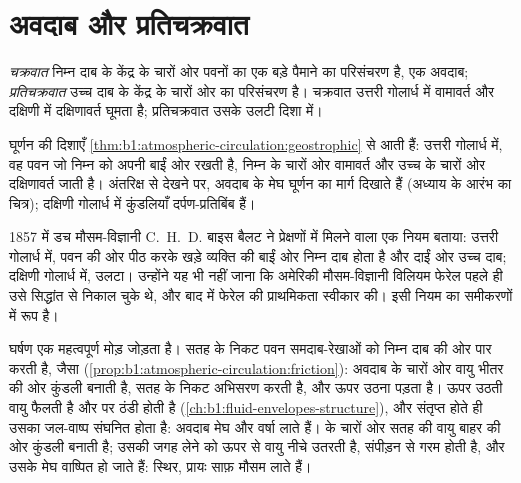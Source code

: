 \section{अवदाब और प्रतिचक्रवात}\label{sec:b1:atmospheric-circulation:cyclones}

\begin{definition}[चक्रवात, प्रतिचक्रवात]\label{def:b1:atmospheric-circulation:cyclone}
\emph{चक्रवात} निम्न दाब के केंद्र के चारों ओर पवनों का एक बड़े पैमाने का परिसंचरण है, एक अवदाब; \emph{प्रतिचक्रवात} उच्च दाब के केंद्र के चारों ओर का परिसंचरण है। चक्रवात उत्तरी गोलार्ध में वामावर्त और दक्षिणी में दक्षिणावर्त घूमता है; प्रतिचक्रवात उसके उलटी दिशा में।
\end{definition}

घूर्णन की दिशाएँ \cref{thm:b1:atmospheric-circulation:geostrophic} से आती हैं:
उत्तरी गोलार्ध में, वह पवन जो निम्न को अपनी बाईं ओर रखती है, निम्न के चारों ओर वामावर्त और उच्च के चारों ओर दक्षिणावर्त जाती है। अंतरिक्ष से देखने पर, अवदाब के मेघ घूर्णन का मार्ग दिखाते हैं (अध्याय के आरंभ का चित्र); दक्षिणी गोलार्ध में कुंडलियाँ दर्पण-प्रतिबिंब हैं।

\begin{history}[बाइस बैलट का नियम, 1857]
1857 में डच मौसम-विज्ञानी C.~H.~D. बाइस बैलट ने प्रेक्षणों में मिलने वाला एक नियम बताया: उत्तरी गोलार्ध में, पवन की ओर पीठ करके खड़े व्यक्ति की बाईं ओर निम्न दाब होता है और दाईं ओर उच्च दाब; दक्षिणी गोलार्ध में, उलटा। उन्होंने यह भी नहीं जाना कि अमेरिकी मौसम-विज्ञानी विलियम फेरेल पहले ही उसे सिद्धांत से निकाल चुके थे, और बाद में फेरेल की प्राथमिकता स्वीकार की।
 इसी नियम का समीकरणों में रूप है।
\end{history}

घर्षण एक महत्वपूर्ण मोड़ जोड़ता है। सतह के निकट पवन समदाब-रेखाओं को निम्न दाब की ओर पार करती है, जैसा (\cref{prop:b1:atmospheric-circulation:friction}): अवदाब के चारों ओर वायु भीतर की ओर कुंडली बनाती है, सतह के निकट अभिसरण करती है, और ऊपर उठना पड़ता है। ऊपर उठती वायु फैलती है और  पर ठंडी होती है (\cref{ch:b1:fluid-envelopes-structure}), और संतृप्त होते ही उसका जल-वाष्प संघनित होता है: अवदाब मेघ और वर्षा लाते हैं।  के चारों ओर सतह की वायु बाहर की ओर कुंडली बनाती है; उसकी जगह लेने को ऊपर से वायु नीचे उतरती है, संपीड़न से गरम होती है, और उसके मेघ वाष्पित हो जाते हैं:  स्थिर, प्रायः साफ़ मौसम लाते हैं।


